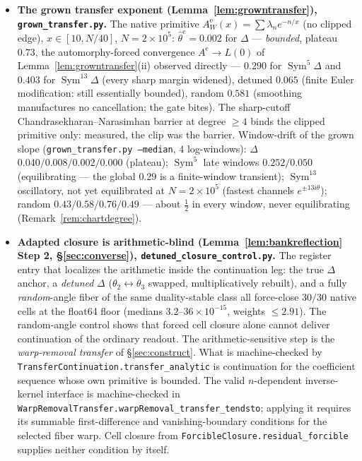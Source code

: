 \documentclass[11pt]{article}
\theoremstyle{definition}
\newcommand{\Sym}{\operatorname{Sym}}
\begin{document}
\begin{itemize}
\item \textbf{The grown transfer exponent (Lemma~\ref{lem:growntransfer}), \texttt{grown\_transfer.py}.}
The native primitive $A^{\mathrm e}_W(x)=\sum\lambda_n e^{-n/x}$ (no clipped edge), $x\in[10,N/40]$,
$N=2\times10^{5}$: $\hat\theta^{\mathrm e}=0.002$ for $\Delta$ --- \emph{bounded}, plateau $0.73$, the
automorphy-forced convergence $A^{\mathrm e}\to L(0)$ of Lemma~\ref{lem:growntransfer}(ii) observed directly
--- $0.290$ for $\Sym^5\Delta$ and $0.403$ for $\Sym^{13}\Delta$ (every sharp margin widened), detuned
$0.065$ (finite Euler modification: still essentially bounded), random $0.581$ (smoothing manufactures no
cancellation; the gate bites). The sharp-cutoff Chandrasekharan--Narasimhan barrier at degree $\ge4$ binds
the clipped primitive only: measured, the clip was the barrier. Window-drift of the grown slope
(\texttt{grown\_transfer.py --median}, $4$ log-windows): $\Delta$ $0.040/0.008/0.002/0.000$ (plateau);
$\Sym^5$ late windows $0.252/0.050$ (equilibrating --- the global $0.29$ is a finite-window transient);
$\Sym^{13}$ oscillatory, not yet equilibrated at $N=2\times10^{5}$ (fastest channels $e^{\pm13i\theta}$);
random $0.43/0.58/0.76/0.49$ --- about $\tfrac12$ in every window, never equilibrating
(Remark~\ref{rem:chartdegree}).

\item \textbf{Adapted closure is arithmetic-blind (Lemma~\ref{lem:bankreflection} Step 2,
\S\ref{sec:converse}), \texttt{detuned\_closure\_control.py}.} The register entry that localizes the
arithmetic inside the continuation leg: the true $\Delta$ anchor, a \emph{detuned} $\Delta$
($\theta_2\leftrightarrow\theta_3$ swapped, multiplicatively rebuilt), and a fully \emph{random}-angle fiber
of the same duality-stable class all force-close $30/30$ native cells at the float64 floor (medians
$3.2$--$36\times10^{-15}$, weights $\le2.91$). The random-angle control shows that forced cell closure alone
cannot deliver continuation of the ordinary readout. The arithmetic-sensitive step is the
\emph{warp-removal transfer} of \S\ref{sec:construct}. What is machine-checked by
\texttt{TransferContinuation.transfer\_analytic} is continuation for the coefficient sequence whose own
primitive is bounded. The valid $n$-dependent inverse-kernel interface is machine-checked in
\texttt{WarpRemovalTransfer.warpRemoval\_transfer\_tendsto}; applying it requires its summable
first-difference and vanishing-boundary conditions for the selected fiber warp. Cell closure from
\texttt{ForcibleClosure.residual\_forcible} supplies neither condition by itself.


\end{itemize}
\end{document}
